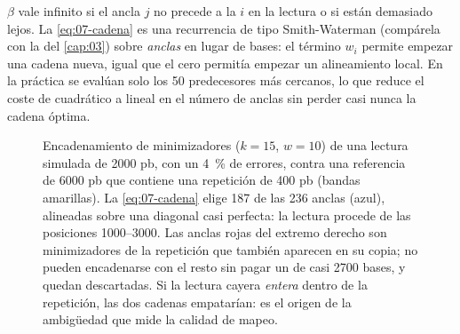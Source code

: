 \begin{simbolos}
\end{simbolos}

$\beta$ vale infinito si el ancla $j$ no precede a la $i$ en la lectura o si están demasiado lejos. La \cref{eq:07-cadena} es una recurrencia de tipo Smith-Waterman (compárela con la del \cref{cap:03}) sobre \emph{anclas} en lugar de bases: el término $w_i$ permite empezar una cadena nueva, igual que el cero permitía empezar un alineamiento local. En la práctica se evalúan solo los 50 predecesores más cercanos, lo que reduce el coste de cuadrático a lineal en el número de anclas sin perder casi nunca la cadena óptima.

\begin{figure}[tbp]
\centering
{}
\caption[Encadenamiento de anclas]{Encadenamiento de minimizadores ($k=15$, $w=10$) de una lectura simulada de \num{2000} pb, con un \SI{4}{\percent} de errores, contra una referencia de \num{6000} pb que contiene una repetición de 400 pb (bandas amarillas). La \cref{eq:07-cadena} elige 187 de las 236 anclas (azul), alineadas sobre una diagonal casi perfecta: la lectura procede de las posiciones \numrange{1000}{3000}. Las anclas rojas del extremo derecho son minimizadores de la repetición que también aparecen en su copia; no pueden encadenarse con el resto sin pagar un  de casi \num{2700} bases, y quedan descartadas. Si la lectura cayera \emph{entera} dentro de la repetición, las dos cadenas empatarían: es el origen de la ambigüedad que mide la calidad de mapeo.}
\label{fig:07-cadena}
\end{figure}

